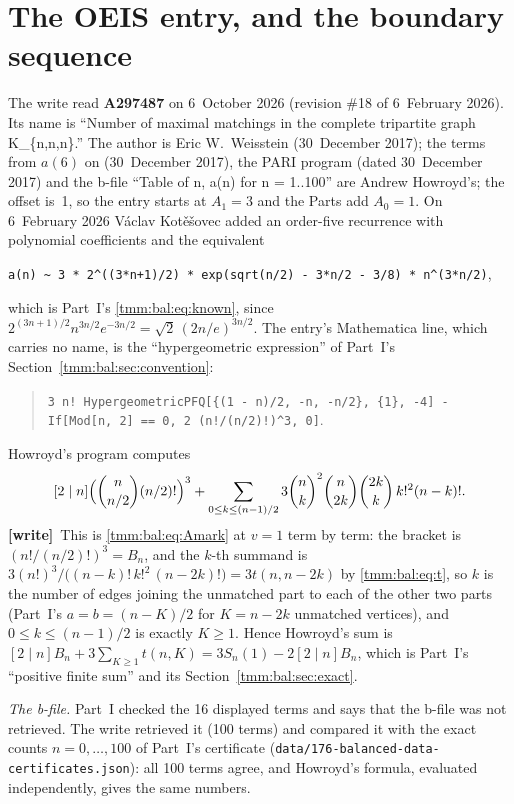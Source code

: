 \documentclass[11pt,letterpaper]{article}
\theoremstyle{remark}\newtheorem{remark}[theorem]{Remark}
\newcommand{\file}[1]{\nolinkurl{#1}}
\newcommand{\wtag}{\textup{\textbf{[write]}}}
\begin{document}
\section*{The OEIS entry, and the boundary sequence}\label{tmm:sec:oeis}
The write read \textbf{A297487} \cite{oeis} on 6~October 2026 (revision \#18 of 6~February 2026). Its name is ``Number of maximal matchings in the complete tripartite graph K\_\{n,n,n\}.'' The author is Eric W.~Weisstein (30~December 2017); the terms from $a(6)$ on (30~December 2017), the PARI program (dated 30~December 2017) and the b-file ``Table of n, a(n) for n = 1..100'' are Andrew Howroyd's; the offset is~1, so the entry starts at $A_1=3$ and the Parts add $A_0=1$. On 6~February 2026 V\'aclav Kot\v{e}\v{s}ovec added an order-five recurrence with polynomial coefficients and the equivalent
\begin{center}
\verb|a(n) ~ 3 * 2^((3*n+1)/2) * exp(sqrt(n/2) - 3*n/2 - 3/8) * n^(3*n/2)|,
\end{center}
which is Part~I's \eqref{tmm:bal:eq:known}, since $2^{(3n+1)/2}n^{3n/2}e^{-3n/2}=\sqrt2\,(2n/e)^{3n/2}$. The entry's Mathematica line, which carries no name, is the ``hypergeometric expression'' of Part~I's Section~\ref{tmm:bal:sec:convention}:
\begin{quote}
\raggedright\texttt{3 n! HypergeometricPFQ[\{(1 - n)/2, -n, -n/2\}, \{1\}, -4] - If[Mod[n, 2] == 0, 2 (n!/(n/2)!)\^{}3, 0]}.
\end{quote}
Howroyd's program computes
\[
 [2\mid n]\Bigl(\binom n{n/2}(n/2)!\Bigr)^3+\sum_{0\le k\le(n-1)/2}3\binom nk^2\binom n{2k}\binom{2k}k\,k!^2(n-k)!.
\]
\wtag\ This is \eqref{tmm:bal:eq:Amark} at $v=1$ term by term: the bracket is $(n!/(n/2)!)^3=B_n$, and the $k$-th summand is $3(n!)^3/\bigl((n-k)!\,k!^2\,(n-2k)!\bigr)=3t(n,n-2k)$ by \eqref{tmm:bal:eq:t}, so $k$ is the number of edges joining the unmatched part to each of the other two parts (Part~I's $a=b=(n-K)/2$ for $K=n-2k$ unmatched vertices), and $0\le k\le(n-1)/2$ is exactly $K\ge1$. Hence Howroyd's sum is $[2\mid n]B_n+3\sum_{K\ge1}t(n,K)=3S_n(1)-2[2\mid n]B_n$, which is Part~I's ``positive finite sum'' and its Section~\ref{tmm:bal:sec:exact}.

\emph{The b-file.} Part~I checked the 16 displayed terms and says that the b-file was not retrieved. The write retrieved it (100 terms) and compared it with the exact counts $n=0,\dots,100$ of Part~I's certificate (\file{data/176-balanced-data-certificates.json}): all 100 terms agree, and Howroyd's formula, evaluated independently, gives the same numbers.
\end{document}
